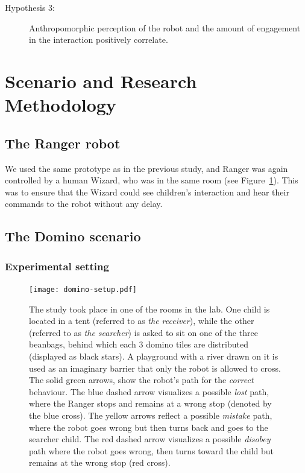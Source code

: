 \documentclass{sig-alternate}
\begin{document}
\begin{description}

    \item[Hypothesis 3:] Anthropomorphic perception of the robot and the amount
    of engagement in the interaction positively correlate.

\end{description}



\section{Scenario and Research Methodology}

\subsection{The Ranger robot}

We used the same prototype as in the previous study, and Ranger was again
controlled by a human Wizard, who was in the same room (see
Figure~\ref{fig:domino-setup}). This was to ensure that the Wizard could see
children's interaction and hear their commands to the robot without any delay.

\subsection{The Domino scenario}

\subsubsection{Experimental setting}

\begin{figure}[ht!] 
    \centering 
    \texttt{[image: domino-setup.pdf]} 
    \caption{\small The study took place in one of the rooms in the lab. One
    child is located in a tent (referred to as \textit{the receiver}), while the
    other (referred to as \textit{the searcher}) is asked to sit on one of the
    three beanbags, behind which each 3 domino tiles are distributed (displayed
    as black stars). A playground with a river drawn on it is used as an
    imaginary barrier that only the robot is allowed to cross. The solid green
    arrows, show the robot's path for the \textit{correct} behaviour. The blue
    dashed arrow visualizes a possible \textit{lost} path, where the Ranger
    stops and remains at a wrong stop (denoted by the blue cross). The yellow
    arrows reflect a possible \textit{mistake} path, where the robot goes wrong
    but then turns back and goes to the searcher child. The red dashed arrow
    visualizes a possible \textit{disobey} path where the robot goes wrong, then
    turns toward the child but remains at the wrong stop (red cross).} 

    \label{fig:domino-setup} 
\end{figure}
\end{document}
